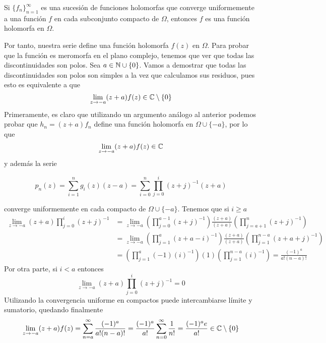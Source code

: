\documentclass[twoside]{article}
\begin{document}
\begin{ejercicio}{1}
\begin{solucion}
\begin{theorem}
Si $\{f_n\}_{n=1}^\infty$ es una sucesión de funciones holomorfas que converge uniformemente a una función $f$ en cada subconjunto compacto de $\Omega$, entonces $f$ es una función holomorfa en $\Omega$.
\end{theorem}

Por tanto, nuestra serie define una función holomorfa $f(z)$ en $\Omega$. Para probar que la función es meromorfa en el plano complejo, tenemos que ver que todas las discontinuidades son polos. Sea $a\in \mathbb{N}\cup\{0\}$. Vamos a demostrar que todas las discontinuidades son polos son simples a la vez que calculamos sus residuos, pues esto es equivalente a que 
$$
\lim_{z\to -a}(z+a)f(z) \in\mathbb{C}\setminus\{0\}
$$
Primeramente, es claro que utilizando un argumento análogo al anterior podemos probar que $h_n = (z+a)f_n$ define una función holomorfa en $\Omega \cup\{-a\}$, por lo que 
$$
\lim_{z\to -a}(z+a)f(z) \in\mathbb{C}
$$
y además la serie

$$
p_n(z) = \sum_{i=1}^n g_i(z) (z-a) = \sum_{i=0}^n \prod_{j=0}^i (z+j)^{-1}(z+a)
$$

converge uniformemente en cada compacto de $\Omega\cup\{-a\}$.  Tenemos que si $i\geq a$
\begin{align*}
\lim_{z\to -a}(z+a)\prod_{j=0}^i \left(z+j\right)^{-1}& =  \lim_{z\rightarrow-a}\left(\prod_{j=0}^{a-1}(z+j)^{-1}\right)\frac{(z+a)}{(z+a)}\left(\prod_{j=a+1}^{n}(z+j)^{-1}\right)\\
&=\lim_{z\rightarrow-a}\left(\prod_{j=1}^{a}(z+a-i)^{-1}\right)\frac{(z+a)}{(z+a)}\left(\prod_{j=1}^{n-a}(z+a+j)^{-1}\right) \\
&=\left(\prod_{j=1}^{a}(-1)(i)^{-1}\right)(1)\left(\prod_{j=1}^{n-a}(i)^{-1}\right)=\frac{(-1)^a}{a!(n-a)!}
\end{align*}
Por otra parte, si $i<a$ entonces
$$
\lim_{z\to -a}(z+a)\prod_{j=0}^i \left(z+j\right)^{-1} = 0
$$
Utilizando la convergencia uniforme en compactos puede intercambiarse límite y sumatorio, quedando finalmente
$$
\lim_{z\to -a}(z+a)f(z) = \sum_{n=a}^\infty \frac{(-1)^a}{a!(n-a)!} = \frac{(-1)^a}{a!}\sum_{n=0}^\infty \frac{1}{n!} = \frac{(-1)^a e}{a!} \in \mathbb{C}\setminus\{0\}
$$
\end{solucion}
\end{ejercicio}
\newpage
\end{document}
